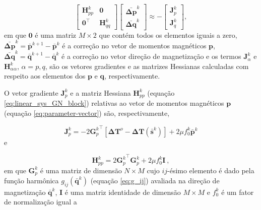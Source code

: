 \begin{equation}
\left[
\begin{array}{c|c}
\mathbf{H}_{pp}^{k} & \mathbf{0} \\
\hline
\mathbf{0}^{\top} & \mathbf{H}_{qq}^{k}
\end{array}
\right] \left[ \begin{array}{c}
\bar{\mathbf{\Delta p}}^{k} \\ 
\bar{\mathbf{\Delta q}}^{k} 
\end{array} \right] \approx -\left[ \begin{array}{c}
\mathbf{J}_{p}^{k} \\ 
\mathbf{J}_{q}^{k} 
\end{array} \right] ,
\label{eq:linear_sys_GN_block}
\end{equation}
em que $\mathbf{0}$ é uma matriz $M \times 2$ que contém todos os elementos iguais a zero, $\bar{\mathbf{\Delta p}}^{k} = \bar{\mathbf{p}}^{k+1} - \bar{\mathbf{p}}^{k}$ é a correção no vetor de momentos magnéticos $\mathbf{p}$, $\bar{\mathbf{\Delta q}}^{k} = \bar{\mathbf{q}}^{k+1} - \bar{\mathbf{q}}^{k}$ é a correção no vetor direção de magnetização e os termos $\mathbf{J}_{\alpha}^{k}$ e $\mathbf{H}_{\alpha \alpha}^{k}$, $\alpha = p,q$, são os vetores gradientes e as matrizes Hessianas calculadas com respeito aos elementos dos $\mathbf{p}$ e $\mathbf{q}$, respectivamente. 

O vetor gradiente $\mathbf{J}_{p}^{k}$ e a matriz Hessiana $\mathbf{H}_{pp}^{k}$ (equação \ref{eq:linear_sys_GN_block}) relativas ao vetor de momentos magnéticos $\mathbf{p}$ (equação \ref{eq:parameter-vector}) são, respectivamente, 

\begin{equation}
\mathbf{J}_{p}^{k} = -2 {\mathbf{G}_{p}^{k}}^{\top} 
\left[ \mathbf{\Delta T}^{o} - \mathbf{\Delta T} (\bar{\mathbf{s}}^{k}) \right] + 
2\mu f_{0}^{k} \bar{\mathbf{p}}^{k} 
\label{eq:grad_p}
\end{equation}
e 

\begin{equation}
\mathbf{H}_{pp}^{k} = 2 {\mathbf{G}_{p}^{k}}^{\top} \mathbf{G}_{p}^{k} + 
2 \mu f_{0}^{k} \mathbf{I} \: ,
\label{eq:hess_p}
\end{equation}
em que $\mathbf{G}_p^{k}$ é uma matriz de dimensão $N \times M$ cujo $ij$-ésimo elemento é dado pela função harmônica $g_{ij}(\bar{\mathbf{q}}^{k})$ (equação \ref{eq:g_ij}) avaliada na direção de magnetização $\bar{\mathbf{q}}^{k}$, $\mathbf{I}$ é uma matriz identidade de dimensão $M \times M$ e $f_{0}^{k}$ é um fator de normalização igual a 

